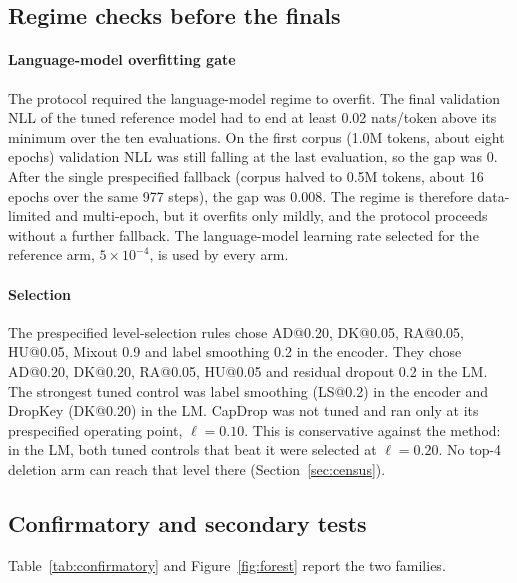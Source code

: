 
\subsection{Regime checks before the finals}\label{sec:regimechecks}
\paragraph{Language-model overfitting gate}
The protocol required the language-model regime to overfit. The final validation NLL of the tuned reference model had
to end at least 0.02 nats/token above its minimum over the ten evaluations. On the first corpus (1.0M tokens, about eight
epochs) validation NLL was still falling at the last evaluation, so the gap was 0. After the single prespecified
fallback (corpus halved to 0.5M tokens, about 16 epochs over the same 977 steps), the gap was 0.008. The regime is therefore data-limited and
multi-epoch, but it overfits only mildly, and the protocol proceeds without a further fallback. The language-model
learning rate selected for the reference arm, $5\times10^{-4}$, is used by every arm.

\paragraph{Selection}
The prespecified level-selection rules chose AD@0.20, DK@0.05, RA@0.05, HU@0.05, Mixout 0.9 and label smoothing 0.2
in the encoder. They chose AD@0.20, DK@0.20, RA@0.05, HU@0.05 and residual dropout 0.2 in the LM. The strongest
tuned control was label smoothing (LS@0.2) in the encoder and DropKey (DK@0.20) in the LM. CapDrop was not tuned and
ran only at its prespecified operating point, $\ell=0.10$. This is conservative against the method: in the LM, both
tuned controls that beat it were selected at $\ell=0.20$. No top-4 deletion arm can reach that level there
(Section~\ref{sec:census}).

\subsection{Confirmatory and secondary tests}\label{sec:confirmatory}
Table~\ref{tab:confirmatory} and Figure~\ref{fig:forest} report the two families.

